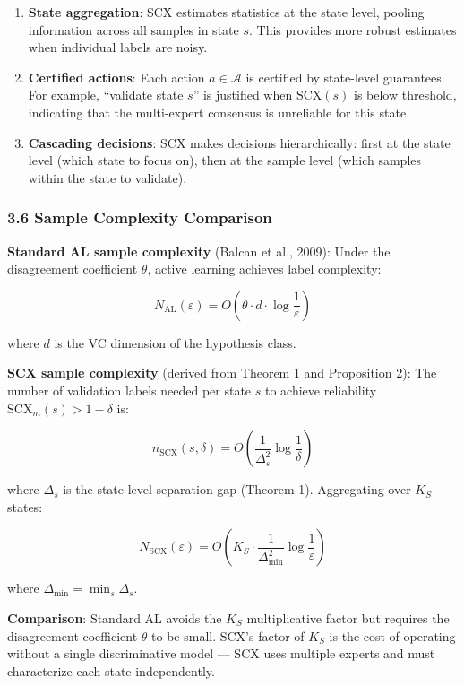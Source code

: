 \documentclass[
  12pt,
]{article}
\begin{document}
\begin{enumerate}
\def\labelenumi{\arabic{enumi}.}
\item
  \textbf{State aggregation}: SCX estimates statistics at the state
  level, pooling information across all samples in state \(s\). This
  provides more robust estimates when individual labels are noisy.
\item
  \textbf{Certified actions}: Each action \(a \in \mathcal{A}\) is
  certified by state-level guarantees. For example, ``validate state
  \(s\)'' is justified when \(\text{SCX}(s)\) is below threshold,
  indicating that the multi-expert consensus is unreliable for this
  state.
\item
  \textbf{Cascading decisions}: SCX makes decisions hierarchically:
  first at the state level (which state to focus on), then at the sample
  level (which samples within the state to validate).
\end{enumerate}

\subsubsection{3.6 Sample Complexity
Comparison}\label{sample-complexity-comparison}

\textbf{Standard AL sample complexity} (Balcan et al., 2009): Under the
disagreement coefficient \(\theta\), active learning achieves label
complexity:

\[N_{\text{AL}}(\varepsilon) = O\left(\theta \cdot d \cdot \log\frac{1}{\varepsilon}\right)\]

where \(d\) is the VC dimension of the hypothesis class.

\textbf{SCX sample complexity} (derived from Theorem 1 and Proposition
2): The number of validation labels needed per state \(s\) to achieve
reliability \(\text{SCX}_m(s) > 1 - \delta\) is:

\[n_{\text{SCX}}(s, \delta) = O\left(\frac{1}{\Delta_s^2} \log\frac{1}{\delta}\right)\]

where \(\Delta_s\) is the state-level separation gap (Theorem 1).
Aggregating over \(K_S\) states:

\[N_{\text{SCX}}(\varepsilon) = O\left(K_S \cdot \frac{1}{\Delta_{\min}^2} \log\frac{1}{\varepsilon}\right)\]

where \(\Delta_{\min} = \min_s \Delta_s\).

\textbf{Comparison}: Standard AL avoids the \(K_S\) multiplicative
factor but requires the disagreement coefficient \(\theta\) to be small.
SCX's factor of \(K_S\) is the cost of operating without a single
discriminative model --- SCX uses multiple experts and must characterize
each state independently.
\end{document}
